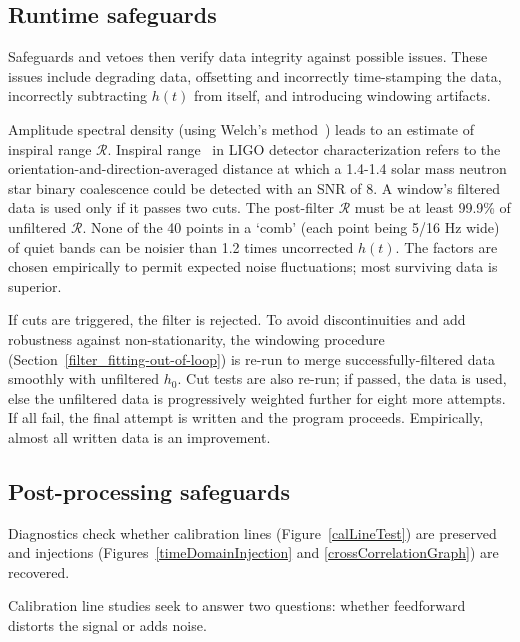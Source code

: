 \subsection{Runtime safeguards}
    \label{runtimeSafeguards}


Safeguards and vetoes then verify data integrity against possible issues. These issues include degrading data, offsetting and incorrectly time-stamping the data, incorrectly subtracting $h(t)$ from itself, and introducing windowing artifacts.

Amplitude spectral density (using Welch's method~\cite{Welch1967}) leads to an estimate of inspiral range $\mathcal{R}$. Inspiral range~\cite{FinnInspiral1993} in LIGO detector characterization refers to the orientation-and-direction-averaged distance at which a 1.4-1.4 solar mass neutron star binary coalescence could be detected with an SNR of 8. A window's filtered data is used only if it passes two cuts. The post-filter $\mathcal{R}$ must be at least 99.9\% of unfiltered $\mathcal{R}$. None of the 40 points in a `comb' (each point being 5/16 Hz wide) of quiet bands can be noisier than 1.2 times uncorrected $h(t)$. The factors are chosen empirically to permit expected noise fluctuations; most surviving data is superior.  

If cuts are triggered, the filter is rejected. To avoid discontinuities and add robustness against non-stationarity, the windowing procedure (Section~\ref{filter_fitting-out-of-loop}) is re-run to merge successfully-filtered data smoothly with unfiltered $h_0$. Cut tests are also re-run; if passed, the data is used, else the unfiltered data is progressively weighted further for eight more attempts. If all fail, the final attempt is written and the program proceeds. Empirically, almost all written data is an improvement.

    \subsection{Post-processing safeguards}
    \label{postprocessingSafeguards}

Diagnostics check whether 
calibration lines (Figure~\ref{calLineTest}) are preserved
and 
injections (Figures~\ref{timeDomainInjection} and \ref{crossCorrelationGraph}) are recovered.

Calibration line studies seek to answer two questions: whether feedforward distorts the signal or adds noise. 

